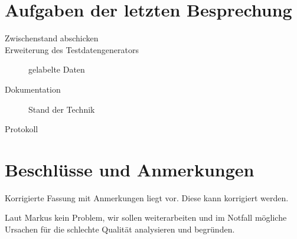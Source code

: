 
\newcommand{\Titel}{7. Protokoll}
\newcommand{\Teilnehmer}{Jonas Bürgel, Markus Reischl, Patrick Welter}
\newcommand{\DatumUndZeit}{07.03.2022 20:00-20:15}
\newcommand{\Ort}{Zoom Meeting}
\newcommand{\Thema}{Erweiterung GAN: Anpassungen zur Qualitätssteigerung}


\section{Aufgaben der letzten Besprechung}
\begin{description}
	\item[Zwischenstand abschicken]  \fullcheck
	\item[Erweiterung des Testdatengenerators] gelabelte Daten  \fullcheck
	\item[Dokumentation] Stand der Technik  \fullcheck
	\item[Protokoll]  \fullcheck
\end{description}

\section{Beschlüsse und Anmerkungen}
\begin{description}[style=nextline]
	\item[Zwischenstand]
	Korrigierte Fassung mit Anmerkungen liegt vor.
	Diese kann korrigiert werden.
	
	\item[Qualität von generierten Bildern]
	Laut Markus kein Problem, wir sollen weiterarbeiten und im Notfall mögliche Ursachen für die schlechte Qualität analysieren und begründen.
\end{description}


